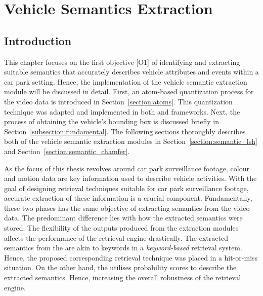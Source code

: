 \chapter{Vehicle Semantics Extraction}

\label{section:semanticsextraction}


\section{Introduction}

This chapter focuses on the first objective [O1] of identifying and extracting suitable semantics that accurately describes vehicle attributes and events within a car park setting. Hence, the implementation of the vehicle semantic extraction module will be discussed in detail.
First, an atom-based quantization process for the video data is introduced in Section~\ref{section:atoms}. This quantization technique was adapted and implemented in both \versionOneExt and \versionTwoExt frameworks. Next, the process of obtaining the vehicle's bounding box is discussed briefly in Section~\ref{subsection:fundamental}.
The following sections thoroughly describes both of the vehicle semantic extraction modules in Section~\ref{section:semantic_lsh} and Section~\ref{section:semantic_chamfer}.


As the focus of this thesis revolves around car park surveillance footage, colour and motion data are key information used to describe vehicle activities. With the goal of designing retrieval techniques suitable for car park surveillance footage, accurate extraction of these information is a crucial component.
Fundamentally, these two phases has the same objective of extracting semantics from the video data.
The predominant difference lies with how the extracted semantics were stored. The flexibility of the outputs produced from the extraction modules affects the performance of the retrieval engine drastically.
The extracted semantics from the \versionOneExt are akin to keywords in a \textit{keyword-based} retrieval system. Hence, the proposed corresponding retrieval technique was placed in a hit-or-miss situation. On the other hand, the \versionTwoExt utilises probability scores to describe the extracted semantics. Hence, increasing the overall robustness of the retrieval engine.



